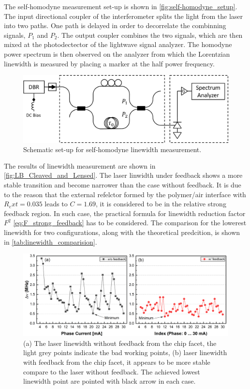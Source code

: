 The self-homodyne measurement set-up is shown in \autoref{fig:self-homodyne_setup}. The input directional coupler of the interferometer splits the light from the laser into two paths. One path is delayed in order to decorrelate the combinning signals, $P_1$ and $P_2$. The output coupler combines the two signals, which are then mixed at the photodectector of the lightwave signal analyzer.  The homodyne power spectrum is then observed on the analyzer from which the Lorentzian linewidth is measured by placing a marker at the half power frequency.
\begin{figure}[ht]
    \centering
    \includegraphics[width=.8\linewidth]{figures/self-homodyne_setup.png}
    \caption{Schematic set-up for self-homodyne linewidth measurement.}
    \label{fig:self-homodyne_setup}
\end{figure}

The results of linewidth measurement are shown in \autoref{fig:LB_Cleaved_and_Lensed}. The laser linwidth under feedback shows a more stable transition and become narrower than the case without feedback. It is due to the reason that the external refelctor formed by the polymer/air interface with $R_ext=0.035$ leads to $C=1.69$, it is considered to be in the relative strong feedback region. In such case, the practical formula for linewidth reduction factor $F^2$ \autoref{eq:F_strong_feedback} has to be considered. The comparison for the lowerest linewidth for two configurations, along with the theoretical predcition, is shown in \autoref{tab:linewidth_comparision}.

\begin{figure}[H]
    \centering
    \includegraphics[width=\linewidth]{figures/LB_Cleaved_and_Lensed.png}
    \caption{(a) The laser linewidth without feedback from the chip facet, the light grey points indicate the bad working points, (b) laser linewidth with feedback from the chip facet, it appears to be more stable compare to the laser without feedback. The achieved lowest linewidth point are pointed with black arrow in each case.}
    \label{fig:LB_Cleaved_and_Lensed}
\end{figure}

